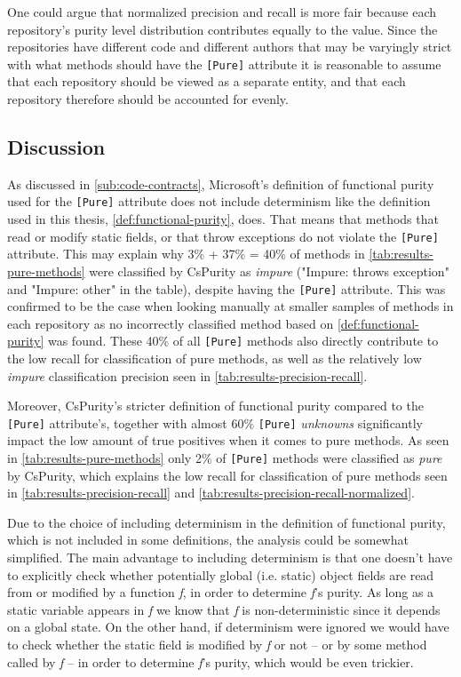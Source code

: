 \documentclass[a4paper,12pt]{article}
\begin{document}
One could argue that normalized precision and recall is more fair because each repository's purity level distribution contributes equally to the value. %
Since the repositories have different code and different authors that may be varyingly strict with what methods should have the \texttt{[Pure]} attribute it is reasonable to assume that each repository should be viewed as a separate entity, and that each repository therefore should be accounted for evenly.

\subsection{Discussion} \label{sub:discussion}

As discussed in \autoref{sub:code-contracts}, Microsoft's definition of functional purity used for the \texttt{[Pure]} attribute does not include determinism like the definition used in this thesis, \autoref{def:functional-purity}, does. That means that methods that read or modify static fields, or that throw exceptions do not violate the \texttt{[Pure]} attribute. This may explain why 3\% + 37\% = 40\% of methods in \autoref{tab:results-pure-methods} were classified by CsPurity as \textit{impure} ("Impure: throws exception" and "Impure: other" in the table), despite having the \texttt{[Pure]} attribute. This was confirmed to be the case when looking manually at smaller samples of methods in each repository as no incorrectly classified method based on \autoref{def:functional-purity} was found. These 40\% of all \texttt{[Pure]} methods also directly contribute to the low recall for classification of pure methods, as well as the relatively low \textit{impure} classification precision seen in \autoref{tab:results-precision-recall}.

Moreover, CsPurity's stricter definition of functional purity compared to the \texttt{[Pure]} attribute's, together with almost 60\% \texttt{[Pure]} \textit{unknowns} significantly impact the low amount of true positives when it comes to pure methods. As seen in \autoref{tab:results-pure-methods} only 2\% of \texttt{[Pure]} methods were classified as \textit{pure} by CsPurity, which explains the low recall for classification of pure methods seen in \autoref{tab:results-precision-recall} and \autoref{tab:results-precision-recall-normalized}.

Due to the choice of including determinism in the definition of functional purity, which is not included in some definitions, the analysis could be somewhat simplified. The main advantage to including determinism is that one doesn't have to explicitly check whether potentially global (i.e. static) object fields are read from or modified by a function \textit{f}, in order to determine \textit{f}'s purity. As long as a static variable appears in \textit{f} we know that \textit{f} is non-deterministic since it depends on a global state. On the other hand, if determinism were ignored we would have to check whether the static field is modified by \textit{f} or not -- or by some method called by \textit{f} -- in order to determine \textit{f}'s purity, which would be even trickier.
\end{document}
